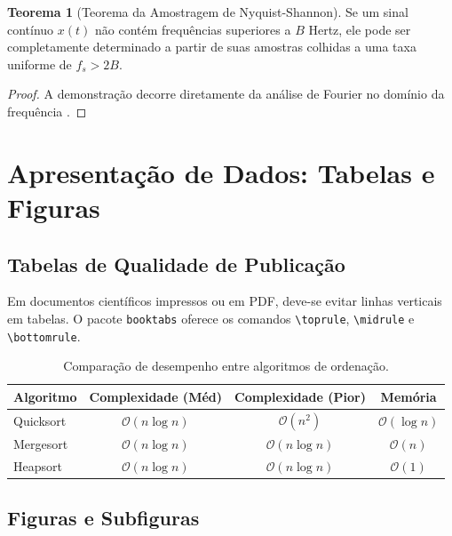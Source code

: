 \documentclass[11pt, a4paper]{article}
\theoremstyle{definition}
\newtheorem{theorem}{Teorema}[section]
\theoremstyle{remark}
\begin{document}
\begin{theorem}[Teorema da Amostragem de Nyquist-Shannon]
\label{thm:shannon}
Se um sinal contínuo $x(t)$ não contém frequências superiores a $B$ Hertz, ele pode ser completamente determinado a partir de suas amostras colhidas a uma taxa uniforme de $f_s > 2B$.
\end{theorem}

\begin{proof}
A demonstração decorre diretamente da análise de Fourier no domínio da frequência \cite{shannon1948}.
\end{proof}

\section{Apresentação de Dados: Tabelas e Figuras}
\label{sec:tabelas}

\subsection{Tabelas de Qualidade de Publicação}

Em documentos científicos impressos ou em PDF, deve-se evitar linhas verticais em tabelas. O pacote \texttt{booktabs} oferece os comandos \texttt{\textbackslash toprule}, \texttt{\textbackslash midrule} e \texttt{\textbackslash bottomrule}.

\begin{table}[h]
\centering
\caption{Comparação de desempenho entre algoritmos de ordenação.}
\label{tab:desempenho}
\begin{tabular}{l c c c}
\toprule
\textbf{Algoritmo} & \textbf{Complexidade (Méd)} & \textbf{Complexidade (Pior)} & \textbf{Memória} \\
\midrule
Quicksort   & $\mathcal{O}(n \log n)$ & $\mathcal{O}(n^2)$      & $\mathcal{O}(\log n)$ \\
Mergesort   & $\mathcal{O}(n \log n)$ & $\mathcal{O}(n \log n)$ & $\mathcal{O}(n)$ \\
Heapsort    & $\mathcal{O}(n \log n)$ & $\mathcal{O}(n \log n)$ & $\mathcal{O}(1)$ \\
\bottomrule
\end{tabular}
\end{table}

\subsection{Figuras e Subfiguras}
\end{document}
